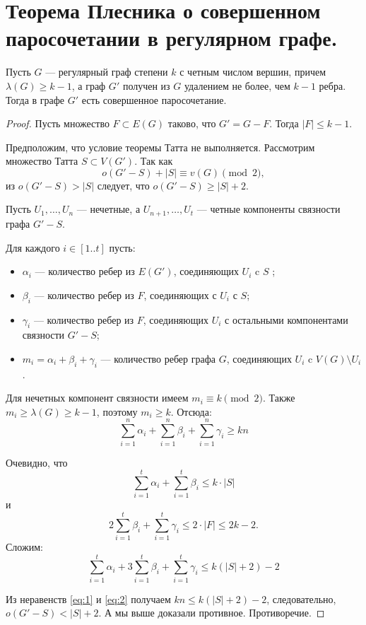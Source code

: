 \section{Теорема Плесника о совершенном паросочетании в регулярном графе.}
\begin{theorem}[Плесник, 1972]
    Пусть $G$ --- регулярный граф степени  $k$ с четным числом вершин, причем $\lambda(G) \ge k-1$, а граф $G'$ получен из $G$ удалением не более, чем $k-1$ ребра. Тогда в графе $G'$ есть совершенное паросочетание.
\end{theorem}
\begin{proof}
    Пусть множество $F \subset E(G)$ таково, что $G' = G - F$. Тогда $\lvert F \rvert \le k-1$.

	Предположим, что условие теоремы Татта не выполняется. Рассмотрим множество Татта $S \subset V(G')$. Так как  \[
		o(G'-S) + \lvert S \rvert  \equiv v(G) \pmod 2
	,\] 
	из $o(G'-S) > \lvert S \rvert$ следует, что $o(G'-S) \ge \lvert S \rvert + 2$.

	Пусть $U_1, \ldots , U_n$ --- нечетные, а $U_{n+1}, \ldots , U_t$ --- четные компоненты связности графа $G'-S$.

	Для каждого $i \in [1..t]$ пусть:
	\begin{itemize}
		\item $\alpha_i$ --- количество ребер из $E(G')$, соединяющих $U_i $ c $S$ ;
		\item $\beta_i$ --- количество ребер из $F$, соединяющих с $U_i$ с $S$;
		\item $\gamma_i$ --- количество ребер из $F$, соединяющих $U_i$ с остальными компонентами связности $G'-S$;
		\item  $m_i = \alpha_i + \beta_i + \gamma_i$  --- количество ребер графа $G$, соединяющих $U_i$ c $V(G) \setminus U_i$.
	\end{itemize}
	Для нечетных компонент связности имеем $m_i \equiv k \pmod 2$. Также $m_i \ge \lambda(G) \ge k-1$, поэтому $m_i \ge k$. Отсюда:
	\begin{equation}\label{eq:1}
		\sum_{i=1}^{n} \alpha_i + \sum_{i=1}^{n} \beta_i + \sum_{i=1}^{n} \gamma_i \ge kn
	\end{equation}

	Очевидно, что
	\[
	\sum_{i=1}^{t} \alpha_i + \sum_{i=1}^{t} \beta_i \le k \cdot \lvert S \rvert
	\] 
	и 
	\[
	2 \sum_{i=1}^{t} \beta_i + \sum_{i=1}^{t} \gamma_i \le 2 \cdot \lvert F \rvert \le 2k-2
	.\] 
	Сложим:
	\begin{equation}\label{eq:2}
		\sum_{i=1}^{t} \alpha_i + 3 \sum_{i=1}^{t} \beta_i + \sum_{i=1}^{t} \gamma_i \le k(\lvert S \rvert + 2) - 2
	\end{equation}

	Из неравенств \ref{eq:1} и \ref{eq:2} получаем $
	kn \le k(\lvert S \rvert+2)-2
	$,
	следовательно, $o(G'-S) < \lvert S \rvert + 2$. А мы выше доказали противное. Противоречие. 
\end{proof}

